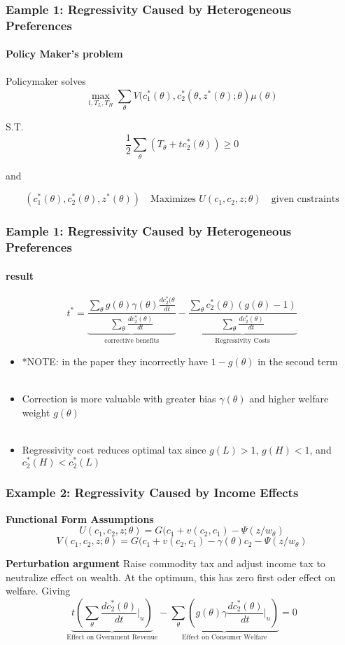 \documentclass{beamer}
\begin{document}
	
	
	
\begin{frame}
\frametitle{Eample 1: Regressivity Caused by Heterogeneous Preferences }
\framesubtitle{Policy Maker's problem}

Policymaker solves 
$$\max\limits_{t, T_L, T_H} \sum_{\theta}^{} V(c_1^*(\theta), c_2^*(\theta, z^*(\theta);\theta)\mu(\theta)  $$

S.T. 
$$ \frac{1}{2} \sum_{\theta}^{}(T_{\theta} + tc_2^*(\theta)) \geq 0 $$

and 

$$ (c_1^*(\theta), c_2^*(\theta), z^*(\theta)) \quad \text{Maximizes } U(c_1,c_2,z;\theta) \quad \text{given cnstraints}$$

\end{frame}

\begin{frame}
\frametitle{Eample 1: Regressivity Caused by Heterogeneous Preferences }
\framesubtitle{result}
$$
t^* = \underbrace{ \frac{\sum_{\theta}^{} g(\theta)\gamma(\theta)\frac{dc_2^*(\theta}{dt}}{\sum_{\theta}\frac{dc_2^*(\theta)}{dt}}}_{ \text{corrective benefits}}
-
\underbrace{\frac{\sum_{\theta}c_2^*(\theta)(g(\theta) -1)}{\sum_{\theta}\frac{dc_2^*(\theta)}{dt}}}_{\text{Regressivity Costs}}
$$

\begin{itemize}


	\item  *NOTE: in the paper they incorrectly have $1-g(\theta)$ in the second term \\~\\

	\item  Correction is more valuable with greater bias $\gamma(\theta)$ and higher welfare weight $g(\theta)$ \\~\\ 

	\item  Regressivity cost reduces optimal tax since $g(L) >1$, $g(H) < 1 $, and $c_2^*(H) < c_2^*(L)$ 

\end{itemize}


\end{frame}




\begin{frame}
\frametitle{Example 2: Regressivity Caused by Income Effects }

\textbf{Functional Form Assumptions}
$$ U(c_1, c_2,z;\theta) = G(c_1 + v(c_2, c_1) - \Psi(z/w_{\theta}) $$
$$ V(c_1, c_2,z;\theta) = G(c_1 + v(c_2, c_1) - \gamma(\theta)c_2 - \Psi(z/w_{\theta})
$$

\textbf{Perturbation argument}
Raise commodity tax and adjust income tax to neutralize effect on wealth. At the optimum, this has zero first oder effect on welfare. Giving 
$$ \underbrace{ t\left( \sum_{\theta} \frac{dc_2^*(\theta)}{dt} \biggr\rvert_{u} \right)}_{ \text{Effect on Gvernment Revenue}} - 
\underbrace{ \sum_{\theta} \left( g(\theta) \gamma \frac{dc_2^*(\theta)}{dt} \biggr\rvert_{u} \right)}_{ \text{Effect on Consumer Welfare}} =0
$$ 


\end{frame}
\end{document}

